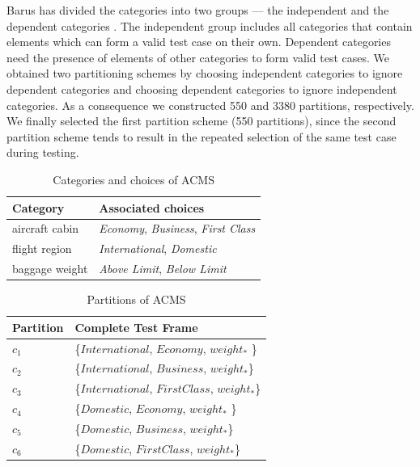 \documentclass[10pt,journal,compsoc]{IEEEtran}
\begin{document}
Barus has divided the categories into two groups --- the independent and the dependent categories \cite{barus2014novel}. The independent group includes all categories that contain elements which can form a valid test case on their own. Dependent categories need the presence of elements of other categories to form valid test cases. We obtained two partitioning schemes by choosing independent categories to ignore dependent categories and choosing dependent categories to ignore independent categories. As a consequence we constructed 550 and 3380 partitions, respectively. We finally selected the first partition scheme (550 partitions), since the second partition scheme tends to result in the repeated selection of the same test case during testing.

\begin{table}
  \caption{Categories and choices of ACMS}
  \label{table:categoryAndchoice}
  \centering
  \begin{tabular}{ll}
  \toprule
  Category                    & Associated choices \\
  \midrule
   aircraft cabin             & \emph{Economy}, \emph{Business}, \emph{First Class} \\
   flight region              & \emph{International}, \emph{Domestic} \\
   baggage weight             & \emph{Above Limit}, \emph{Below Limit} \\
  \bottomrule
  \end{tabular}
\end{table}

\begin{table}
  \caption{Partitions of ACMS}
  \label{table:partitionrule}
  \centering
  \begin{tabular}{ll} \toprule
  Partition       & Complete Test Frame \\ \midrule
  $c_1$  & \{$International$, $Economy$, $weight_*$ \} \\
  $c_2$  & \{$International$, $Business$, $weight_*$\} \\
  $c_3$  & \{$International$, $First Class$, $weight_*$\} \\
  $c_4$  & \{$Domestic$, $Economy$, $weight_*$ \} \\
  $c_5$  & \{$Domestic$, $Business$, $weight_*$\} \\
  $c_6$  & \{$Domestic$, $First Class$, $weight_*$\} \\ \bottomrule
  \end{tabular}
\end{table}
\end{document}
